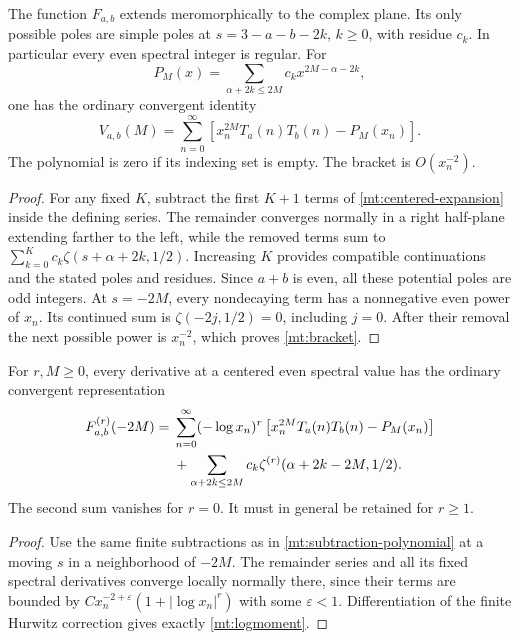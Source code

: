 \begin{proposition}
\label{mt:regularity}
The function $F_{a,b}$ extends meromorphically to the complex plane.
Its only possible poles are simple poles at
$s=3-a-b-2k$, $k\ge0$, with residue $c_k$.
In particular every even spectral integer is regular. For
\begin{equation}\label{mt:subtraction-polynomial}
 P_M(x)=\sum_{\alpha+2k\le2M}c_kx^{2M-\alpha-2k},
\end{equation}
one has the ordinary convergent identity
\begin{equation}\label{mt:bracket}
 V_{a,b}(M)=\sum_{n=0}^{\infty}
 \left[x_n^{2M}T_a(n)T_b(n)-P_M(x_n)\right].
\end{equation}
The polynomial is zero if its indexing set is empty. The bracket is
$O(x_n^{-2})$.
\end{proposition}

\begin{proof}
For any fixed $K$, subtract the first $K+1$ terms of
\eqref{mt:centered-expansion} inside the defining series. The remainder
converges normally in a right half-plane extending farther to the left,
while the removed terms
sum to
$\sum_{k=0}^K c_k\zeta(s+\alpha+2k,1/2)$.
Increasing $K$ provides compatible continuations and the stated poles
and residues. Since $a+b$ is even, all these potential poles are odd
integers. At $s=-2M$, every nondecaying term has a nonnegative even
power of $x_n$. Its continued sum is
$\zeta(-2j,1/2)=0$, including $j=0$. After their removal the next
possible power is $x_n^{-2}$, which proves \eqref{mt:bracket}.
\end{proof}

\begin{corollary}
\label{mt:spectralderivatives}
For $r,M\geq0$, every derivative at a centered even spectral value has
the ordinary convergent representation
\begin{align}
 F_{a,b}^{(r)}(-2M)
  ={}&\sum_{n=0}^{\infty}(-\log x_n)^r
       \left[x_n^{2M}T_a(n)T_b(n)-P_M(x_n)\right]\notag\\
    &+\sum_{\alpha+2k\leq2M}
               c_k\zeta^{(r)}(\alpha+2k-2M,1/2).
 \label{mt:logmoment}
\end{align}
The second sum vanishes for $r=0$. It must in general be retained for
$r\geq1$.
\end{corollary}
\begin{proof}
Use the same finite subtractions as in \eqref{mt:subtraction-polynomial}
at a moving $s$ in a neighborhood of $-2M$. The remainder series and all
its fixed spectral derivatives converge locally normally there, since
their terms are bounded by $C x_n^{-2+\varepsilon}(1+|\log x_n|^r)$
with some $\varepsilon<1$. Differentiation of the finite Hurwitz
correction gives exactly \eqref{mt:logmoment}.
\end{proof}

